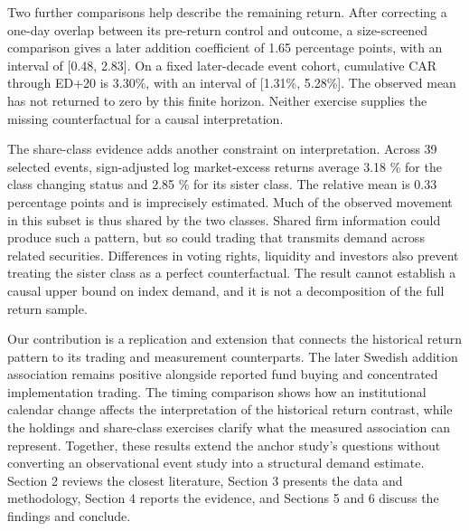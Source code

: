 Two further comparisons help describe the remaining return. After correcting a one-day overlap between its pre-return control and outcome, a size-screened comparison gives a later addition coefficient of 1.65 percentage points, with an interval of [0.48, 2.83]. On a fixed later-decade event cohort, cumulative CAR through ED+20 is 3.30\%, with an interval of [1.31\%, 5.28\%]. The observed mean has not returned to zero by this finite horizon. Neither exercise supplies the missing counterfactual for a causal interpretation.

The share-class evidence adds another constraint on interpretation. Across 39 selected events, sign-adjusted log market-excess returns average 3.18 \% for the class changing status and 2.85 \% for its sister class. The relative mean is 0.33 percentage points and is imprecisely estimated. Much of the observed movement in this subset is thus shared by the two classes. Shared firm information could produce such a pattern, but so could trading that transmits demand across related securities. Differences in voting rights, liquidity and investors also prevent treating the sister class as a perfect counterfactual. The result cannot establish a causal upper bound on index demand, and it is not a decomposition of the full return sample.

Our contribution is a replication and extension that connects the historical return pattern to its trading and measurement counterparts. The later Swedish addition association remains positive alongside reported fund buying and concentrated implementation trading. The timing comparison shows how an institutional calendar change affects the interpretation of the historical return contrast, while the holdings and share-class exercises clarify what the measured association can represent. Together, these results extend the anchor study's questions without converting an observational event study into a structural demand estimate. Section 2 reviews the closest literature, Section 3 presents the data and methodology, Section 4 reports the evidence, and Sections 5 and 6 discuss the findings and conclude.
